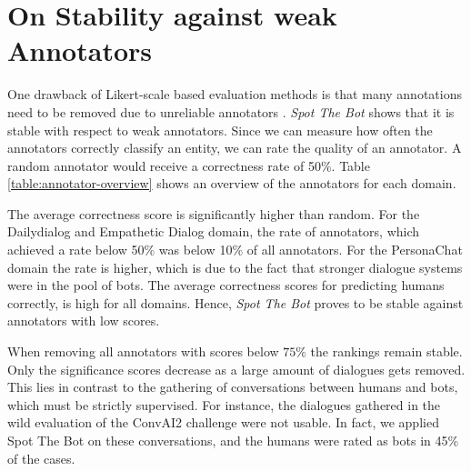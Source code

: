 \documentclass[11pt,a4paper]{article}
\begin{document}
\section{On Stability against weak Annotators}
One drawback of Likert-scale based evaluation methods is that many annotations need to be removed due to unreliable annotators \cite{lowe-etal-2017-towards}. \emph{Spot The Bot} shows that it is stable with respect to weak annotators. Since we can measure how often the annotators correctly classify an entity, we can rate the quality of an annotator. A random annotator would receive a correctness rate of 50\%. Table \ref{table:annotator-overview} shows an overview of the annotators for each domain. 



 The average correctness score is significantly higher than random. For the Dailydialog and Empathetic Dialog domain, the rate of annotators, which achieved a rate below 50\% was below 10\% of all annotators. For the PersonaChat domain the rate is higher, which is due to the fact that stronger dialogue systems were in the pool of bots. The average correctness scores for predicting humans correctly, is high for all domains. 
Hence, \emph{Spot The Bot} proves to be stable against annotators with low scores. 

When removing all annotators with scores below $75\%$ the rankings remain stable. Only the significance scores decrease as a large amount of dialogues gets removed. This lies in contrast to the gathering of conversations between humans and bots, which must be strictly supervised. For instance, the dialogues gathered in the wild evaluation of the ConvAI2 challenge were not usable. In fact, we applied Spot The Bot on these conversations, and the humans were rated as bots in 45\% of the cases.
\end{document}
